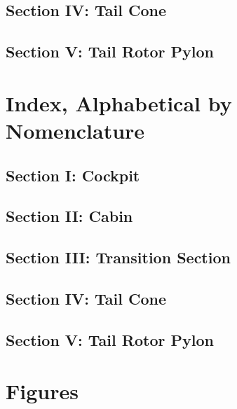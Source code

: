 \documentclass[letterpaper,11pt,openany,oneside]{book}
\begin{document}
\section{Section IV: Tail Cone}

\clearpage
\section{Section V: Tail Rotor Pylon}

\chapter{Index, Alphabetical by Nomenclature}
\section{Section I: Cockpit}

\clearpage
\section{Section II: Cabin}

\clearpage
\section{Section III: Transition Section}

\clearpage
\section{Section IV: Tail Cone}

\clearpage
\section{Section V: Tail Rotor Pylon}


\renewcommand{\thefigure}{\arabic{figure}}
\setcounter{figure}{0}
\captionsetup{format=hang,labelformat=default,labelsep=endash}
\chapter{Figures}

\end{document}
